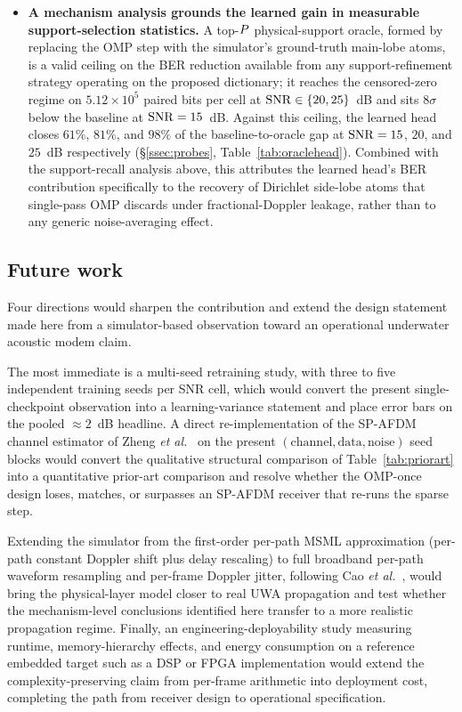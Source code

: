 \begin{itemize}[leftmargin=1.3em,itemsep=4pt,topsep=2pt]
\item \textbf{A mechanism analysis grounds the learned gain in measurable support-selection statistics.}
A top-$P$ physical-support oracle, formed by replacing the OMP step with the simulator's ground-truth main-lobe atoms, is a valid ceiling on the BER reduction available from any support-refinement strategy operating on the proposed dictionary; it reaches the censored-zero regime on $5.12 \times 10^{5}$ paired bits per cell at $\mathrm{SNR} \in \{20, 25\}$~dB and sits $8\sigma$ below the baseline at $\mathrm{SNR} = 15$~dB. Against this ceiling, the learned head closes $61\%$, $81\%$, and $98\%$ of the baseline-to-oracle gap at $\mathrm{SNR} = 15$, $20$, and $25$~dB respectively (\S\ref{ssec:probes}, Table~\ref{tab:oraclehead}). Combined with the support-recall analysis above, this attributes the learned head's BER contribution specifically to the recovery of Dirichlet side-lobe atoms that single-pass OMP discards under fractional-Doppler leakage, rather than to any generic noise-averaging effect.

\end{itemize}

\subsection*{Future work}

Four directions would sharpen the contribution and extend the design statement made here from a simulator-based observation toward an operational underwater acoustic modem claim.

The most immediate is a multi-seed retraining study, with three to five independent training seeds per SNR cell, which would convert the present single-checkpoint observation into a learning-variance statement and place error bars on the pooled $\approx 2$~dB headline. A direct re-implementation of the SP-AFDM channel estimator of Zheng \emph{et al.}~\cite{qing2024spafdm} on the present $(\mathrm{channel}, \mathrm{data}, \mathrm{noise})$ seed blocks would convert the qualitative structural comparison of Table~\ref{tab:priorart} into a quantitative prior-art comparison and resolve whether the OMP-once design loses, matches, or surpasses an SP-AFDM receiver that re-runs the sparse step.

Extending the simulator from the first-order per-path MSML approximation (per-path constant Doppler shift plus delay rescaling) to full broadband per-path waveform resampling and per-frame Doppler jitter, following Cao \emph{et al.}~\cite{zhou2024msmlafdm}, would bring the physical-layer model closer to real UWA propagation and test whether the mechanism-level conclusions identified here transfer to a more realistic propagation regime. Finally, an engineering-deployability study measuring runtime, memory-hierarchy effects, and energy consumption on a reference embedded target such as a DSP or FPGA implementation would extend the complexity-preserving claim from per-frame arithmetic into deployment cost, completing the path from receiver design to operational specification.
